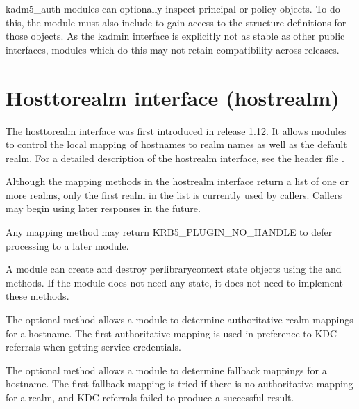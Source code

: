 \documentclass[letterpaper,10pt,english]{sphinxmanual}
\begin{document}
\sphinxAtStartPar
kadm5\_auth modules can optionally inspect principal or policy objects.
To do this, the module must also include  to gain
access to the structure definitions for those objects.  As the kadmin
interface is explicitly not as stable as other public interfaces,
modules which do this may not retain compatibility across releases.


\section{Host\sphinxhyphen{}to\sphinxhyphen{}realm interface (hostrealm)}
\label{\detokenize{plugindev/hostrealm:host-to-realm-interface-hostrealm}}\label{\detokenize{plugindev/hostrealm:hostrealm-plugin}}\label{\detokenize{plugindev/hostrealm::doc}}
\sphinxAtStartPar
The host\sphinxhyphen{}to\sphinxhyphen{}realm interface was first introduced in release 1.12.  It
allows modules to control the local mapping of hostnames to realm
names as well as the default realm.  For a detailed description of the
hostrealm interface, see the header file
.

\sphinxAtStartPar
Although the mapping methods in the hostrealm interface return a list
of one or more realms, only the first realm in the list is currently
used by callers.  Callers may begin using later responses in the
future.

\sphinxAtStartPar
Any mapping method may return KRB5\_PLUGIN\_NO\_HANDLE to defer
processing to a later module.

\sphinxAtStartPar
A module can create and destroy per\sphinxhyphen{}library\sphinxhyphen{}context state objects
using the  and  methods.  If the module does not need
any state, it does not need to implement these methods.

\sphinxAtStartPar
The optional  method allows a module to determine
authoritative realm mappings for a hostname.  The first authoritative
mapping is used in preference to KDC referrals when getting service
credentials.

\sphinxAtStartPar
The optional  method allows a module to determine
fallback mappings for a hostname.  The first fallback mapping is tried
if there is no authoritative mapping for a realm, and KDC referrals
failed to produce a successful result.
\end{document}

